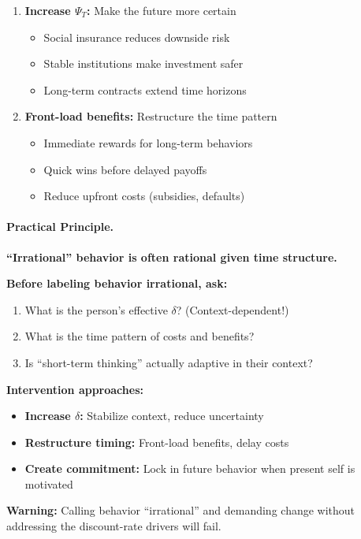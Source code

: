 \begin{enumerate}
\item \textbf{Increase $\Psi_T$:} Make the future more certain
\begin{itemize}
\item Social insurance reduces downside risk
\item Stable institutions make investment safer
\item Long-term contracts extend time horizons
\end{itemize}

\item \textbf{Front-load benefits:} Restructure the time pattern
\begin{itemize}
\item Immediate rewards for long-term behaviors
\item Quick wins before delayed payoffs
\item Reduce upfront costs (subsidies, defaults)
\end{itemize}
\end{enumerate}

\paragraph{Practical Principle.}

\begin{tcolorbox}[colback=blue!5!white, colframe=blue!75!black, title=Principle 5: Respect the Discount Rate]
\textbf{``Irrational'' behavior is often rational given time structure.}

\textbf{Before labeling behavior irrational, ask:}
\begin{enumerate}
\item What is the person's effective $\delta$? (Context-dependent!)
\item What is the time pattern of costs and benefits?
\item Is ``short-term thinking'' actually adaptive in their context?
\end{enumerate}

\textbf{Intervention approaches:}
\begin{itemize}
\item \textbf{Increase $\delta$:} Stabilize context, reduce uncertainty
\item \textbf{Restructure timing:} Front-load benefits, delay costs
\item \textbf{Create commitment:} Lock in future behavior when present self is motivated
\end{itemize}

\textbf{Warning:} Calling behavior ``irrational'' and demanding change 
without addressing the discount-rate drivers will fail.
\end{tcolorbox}

